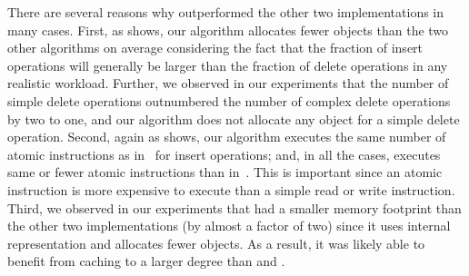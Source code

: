 
There are several reasons why \ICDCN{} outperformed the other two implementations in many cases. First, as  shows, our algorithm allocates fewer objects than the two other algorithms on average considering the fact that the fraction of insert operations will generally be larger than the fraction of delete operations in any realistic workload. Further, we observed in our experiments that the number of simple delete operations outnumbered the number of complex delete operations by two to one, and our algorithm does not allocate any object for a simple delete operation. Second, again as  shows, our algorithm executes the same number of atomic instructions as in~\cite{NatMit:2014:PPoPP} for insert operations;  and, in all the cases,  executes same or fewer atomic instructions than in~\cite{HowJon:2012:SPAA}. This is important since an atomic instruction is more expensive to execute than a simple read or write instruction. Third, we observed in our experiments that \ICDCN{} had a smaller memory footprint than the other two implementations (by almost a factor of two) since it uses internal representation and allocates fewer objects. As a result, it was likely able to benefit from caching to a larger degree than \HJBST{} and \NMBST{}.